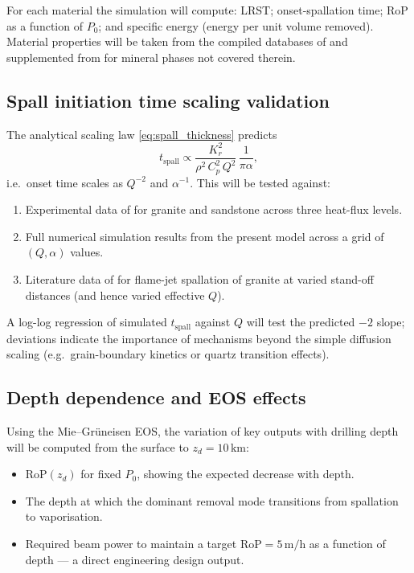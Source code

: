 \documentclass[12pt, a4paper]{article}
\begin{document}
\noindent
For each material the simulation will compute: LRST; onset-spallation time;
RoP as a function of $P_0$; and specific energy (energy per unit volume removed).
Material properties will be taken from the compiled databases of
\citet{vogler2020simulation} and supplemented from \citet{liu2023failure} for
mineral phases not covered therein.

\subsection{Spall initiation time scaling validation}
\label{sec:scaling_validation}

The analytical scaling law \cref{eq:spall_thickness} predicts
\begin{equation}
    t_\mathrm{spall} \propto \frac{K_r^2}{\rho^2\,C_p^2\,Q^2}\,
    \frac{1}{\pi\alpha},
    \label{eq:t_scaling}
\end{equation}
i.e.\ onset time scales as $Q^{-2}$ and $\alpha^{-1}$.  This will be tested
against:
\begin{enumerate}[noitemsep]
    \item Experimental data of \citet{hu2018lrst} for granite and sandstone
          across three heat-flux levels.
    \item Full numerical simulation results from the present model across a
          grid of $(Q, \alpha)$ values.
    \item Literature data of \citet{wilkinson1993experimental} for flame-jet
          spallation of granite at varied stand-off distances (and hence varied
          effective $Q$).
\end{enumerate}
A log-log regression of simulated $t_\mathrm{spall}$ against $Q$ will test the
predicted $-2$ slope; deviations indicate the importance of mechanisms beyond
the simple diffusion scaling (e.g.\ grain-boundary kinetics or quartz transition
effects).

\subsection{Depth dependence and EOS effects}

Using the Mie--Gr\"{u}neisen EOS, the variation of key outputs with drilling
depth will be computed from the surface to $z_d = 10\,\mathrm{km}$:
\begin{itemize}[noitemsep]
    \item $\mathrm{RoP}(z_d)$ for fixed $P_0$, showing the expected decrease
          with depth.
    \item The depth at which the dominant removal mode transitions from
          spallation to vaporisation.
    \item Required beam power to maintain a target $\mathrm{RoP} = 5\,\mathrm{m/h}$
          as a function of depth — a direct engineering design output.
\end{itemize}
\end{document}

